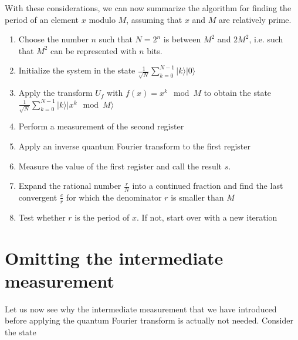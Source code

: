 \documentclass[a4paper, draft]{article}
\theoremstyle{own}
\theoremstyle{remark}
\begin{document}
With these considerations, we can now summarize the algorithm for finding the period of an element $x$ modulo $M$, assuming that $x$ and $M$ are relatively prime.

\begin{enumerate}
	\item Choose the number $n$ such that $N=2^n$ is between $M^2$ and $2M^2$, i.e. such that $M^2$ can be represented with $n$ bits.
	\item Initialize the system in the state $\frac{1}{\sqrt{N}} \sum_{k=0}^{N-1} |k \rangle  |0\rangle$
	\item Apply the transform $U_f$ with $f(x) = x^k \mod M$ to obtain the state
	$\frac{1}{\sqrt{N}} \sum_{k=0}^{N-1} |k \rangle  |x^k \mod M \rangle$
	\item Perform a measurement of the second register
	\item Apply an inverse quantum Fourier transform to the first register
	\item Measure the value of the first register and call the result $s$.
	\item Expand the rational number $\frac{r}{N}$ into a continued fraction and find the last convergent $\frac{c}{r}$ for which the denominator $r$ is smaller than $M$
	\item Test whether $r$ is the period of $x$. If not, start over with a new iteration 
\end{enumerate}


\section{Omitting the intermediate measurement}

Let us now see why the intermediate measurement that we have introduced before applying the quantum Fourier transform is actually not needed. Consider the state
\end{document}
